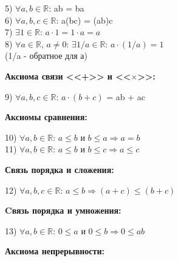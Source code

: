 \documentclass{article}
\DeclareMathOperator{\Exists}{\exists}
\begin{document}
\begin{center}
   5) $\forall a,b \in \mathbb{R}$: ab = ba \\
   6) $\forall a,b,c \in \mathbb{R}$: a(bc) = (ab)c \\
   7) $\exists 1 \in \mathbb{R}$: $a\cdot 1 = 1 \cdot a = a$ \\
   8) $\forall a \in \mathbb{R}$, $a \neq 0$: $\Exists 1/a \in \mathbb{R}$: $a \cdot (1/a) = 1$\\
   (1/a - обратное для а) \\
\end{center}
\newpage
\begin{center}
   \textbf{Аксиома связи <<+>> и <<$\times$>>:}
\end{center}
\begin{center}
   9) $\forall a,b,c \in \mathbb{R}$: $a\cdot(b + c)$ = ab + ac\\
\end{center}
 
\begin{center}
   \textbf{Аксиомы сравнения:}
\end{center}
 
\begin{center}
   10) $\forall a,b \in \mathbb{R}$: $ a \leq b $ и $ b \leq a \Rightarrow  a = b $ \\
   11) $\forall a,b \in \mathbb{R}$: $ a \leq b$ и $ b \leq c \Rightarrow a \leq c $ \\
\end{center}
 
\begin{center}
   \textbf{Связь порядка и сложения:}
\end{center}
 
\begin{center}
   12) $\forall a,b,c \in \mathbb{R}$: $ a \leq b \Rightarrow (a + c) \leq (b + c)$ \\
\end{center}
 
\begin{center}
   \textbf{Cвязь порядка и умножения:}
\end{center}
 
\begin{center}
   13) $\forall a,b \in \mathbb{R}$: $ 0 \leq a $ и $ 0 \leq b \Rightarrow 0 \leq ab $ \\
\end{center}
 
\begin{center}
   \textbf{Аксиома непрерывности:}
\end{center}
 
\end{document}
